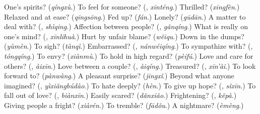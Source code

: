 \begin{tcolorbox}[breakable,colback=teal!4,colframe=teal!35!black,title={Before you move on}]
One's spirits? (\emph{qíngxù}.) To feel for someone? (\textbf{}, \emph{xīnténg}.) Thrilled? (\emph{xīngfèn}.) Relaxed and at ease? (\emph{qīngsōng}.) Fed up? (\emph{fán}.) Lonely? (\emph{gūdān}.) A matter to deal with? (\textbf{}, \emph{shìqing}.) Affection between people? (\textbf{}, \emph{gǎnqíng}.) What is really on one's mind? (\textbf{}, \emph{xīnlihuà}.) Hurt by unfair blame? (\emph{wěiqu}.) Down in the dumps? (\emph{yùmèn}.) To sigh? (\emph{tànqì}.) Embarrassed? (\textbf{}, \emph{nánwéiqíng}.) To sympathize with? (\textbf{}, \emph{tóngqíng}.) To envy? (\emph{xiànmù}.) To hold in high regard? (\emph{pèifú}.) Love and care for others? (\textbf{}, \emph{àixīn}.) Love between a couple? (\textbf{}, \emph{àiqíng}.) Treasured? (\textbf{}, \emph{xīn'ài}.) To look forward to? (\emph{pànwàng}.) A pleasant surprise? (\emph{jīngxǐ}.) Beyond what anyone imagined? (\textbf{}, \emph{yìxiǎngbúdào}.) To hate deeply? (\emph{hèn}.) To give up hope? (\textbf{}, \emph{sǐxīn}.) To fall out of love? (\textbf{}, \emph{biànxīn}.) Easily scared? (\emph{dǎnxiǎo}.) Frightening? (\textbf{}, \emph{kěpà}.) Giving people a fright? (\emph{xiàrén}.) To tremble? (\emph{fādǒu}.) A nightmare? (\emph{èmèng}.)
\end{tcolorbox}
